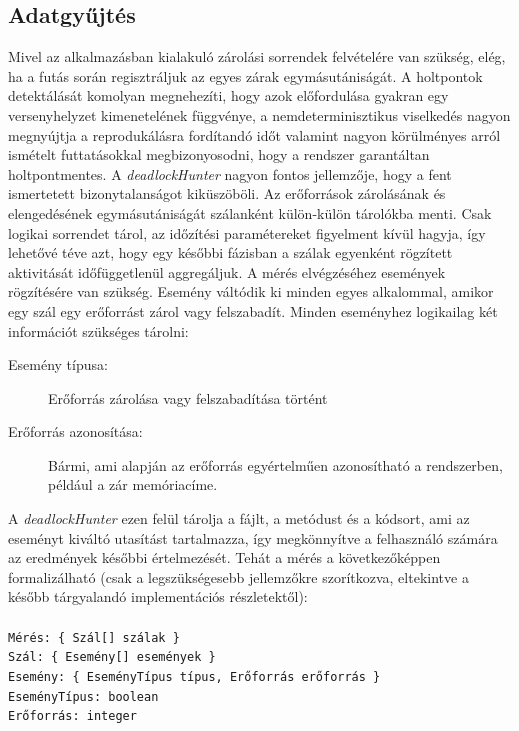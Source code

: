     \subsection{Adatgyűjtés}
    Mivel az alkalmazásban kialakuló zárolási sorrendek felvételére van szükség, elég, ha a futás során regisztráljuk az egyes zárak egymásutániságát. A holtpontok detektálását komolyan megnehezíti, hogy azok előfordulása gyakran egy versenyhelyzet kimenetelének függvénye, a nemdeterminisztikus viselkedés nagyon megnyújtja a reprodukálásra fordítandó időt valamint nagyon körülményes arról ismételt futtatásokkal megbizonyosodni, hogy a rendszer garantáltan holtpontmentes.
    A \emph{deadlockHunter} nagyon fontos jellemzője, hogy a fent ismertetett bizonytalanságot kiküszöböli. Az erőforrások zárolásának és elengedésének egymásutániságát szálanként külön-külön tárolókba menti. Csak logikai sorrendet tárol, az időzítési paramétereket figyelment kívül hagyja, így lehetővé téve azt, hogy egy későbbi fázisban a szálak egyenként rögzített aktivitását időfüggetlenül aggregáljuk.
    A mérés elvégzéséhez események rögzítésére van szükség. Esemény váltódik ki minden egyes alkalommal, amikor egy szál egy erőforrást zárol vagy felszabadít. Minden eseményhez logikailag két információt szükséges tárolni:
    
    \begin{description}
        \item[Esemény típusa:] Erőforrás zárolása vagy felszabadítása történt
        \item[Erőforrás azonosítása:] Bármi, ami alapján az erőforrás egyértelműen azonosítható a rendszerben, például a zár memóriacíme.
    \end{description}

    A \emph{deadlockHunter} ezen felül tárolja a fájlt, a metódust és a kódsort, ami az eseményt kiváltó utasítást tartalmazza, így megkönnyítve a felhasználó számára az eredmények későbbi értelmezését.
    Tehát a mérés a következőképpen formalizálható (csak a legszükségesebb jellemzőkre szorítkozva, eltekintve a később tárgyalandó implementációs részletektől): \\ \\
\texttt{Mérés: \{ Szál[] szálak \} \\
Szál: \{ Esemény[] események \} \\
Esemény: \{ EseményTípus típus, Erőforrás erőforrás \} \\
EseményTípus: boolean \\
Erőforrás: integer \\
}

